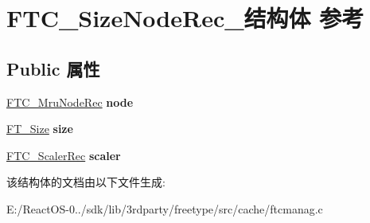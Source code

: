\hypertarget{struct_f_t_c___size_node_rec__}{}\section{F\+T\+C\+\_\+\+Size\+Node\+Rec\+\_\+结构体 参考}
\label{struct_f_t_c___size_node_rec__}
\subsection*{Public 属性}
\begin{DoxyCompactItemize}
\item 
\mbox{\label{struct_f_t_c___size_node_rec___aa5f6e70ce1df0eee0a2c7b8712e1465d}} 
\hyperlink{struct_f_t_c___mru_node_rec__}{F\+T\+C\+\_\+\+Mru\+Node\+Rec} {\bfseries node}
\item 
\mbox{\label{struct_f_t_c___size_node_rec___a09254f7f7154266fa9d71bd94ca80d69}} 
\hyperlink{struct_f_t___size_rec__}{F\+T\+\_\+\+Size} {\bfseries size}
\item 
\mbox{\label{struct_f_t_c___size_node_rec___ac26844d2ec4f3659694d630a988cdf22}} 
\hyperlink{struct_f_t_c___scaler_rec__}{F\+T\+C\+\_\+\+Scaler\+Rec} {\bfseries scaler}
\end{DoxyCompactItemize}


该结构体的文档由以下文件生成\+:\begin{DoxyCompactItemize}
\item 
E\+:/\+React\+O\+S-\/0../sdk/lib/3rdparty/freetype/src/cache/ftcmanag.\+c\end{DoxyCompactItemize}
